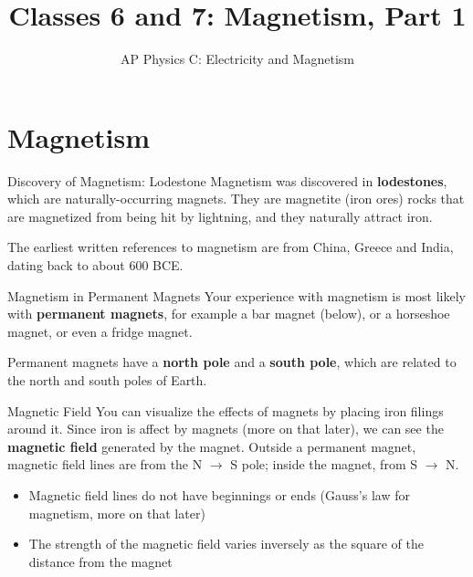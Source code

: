 \documentclass[12pt,aspectratio=169]{beamer}
\title{Classes 6 and 7: Magnetism, Part 1}
\subtitle{AP Physics C: Electricity and Magnetism}
\begin{document}
\begin{frame}
  \maketitle
\end{frame}



\section[Discovery]{Magnetism}

\begin{frame}{Discovery of Magnetism: Lodestone}
  Magnetism was discovered in \textbf{lodestones}, which are naturally-occurring
  magnets. They are magnetite (iron ores) rocks that are magnetized from being
  hit by lightning, and they naturally attract iron.
  \begin{center}
  \end{center}
  The earliest written references to magnetism are from China, Greece and
  India, dating back to about 600 BCE.
\end{frame}



\begin{frame}{Magnetism in Permanent Magnets}
  Your experience with magnetism is most likely with \textbf{permanent
    magnets}, for example a bar magnet (below), or a horseshoe magnet, or even
  a fridge magnet.
  \begin{center}
  \end{center}
  Permanent magnets have a \textbf{north pole} and a \textbf{south pole}, which
  are related to the north and south poles of Earth.
\end{frame}


\begin{frame}{Magnetic Field}
  You can visualize the effects of magnets by placing iron filings around it.
  Since iron is affect by magnets (more on that later), we can see the
  \textbf{magnetic field} generated by the magnet.
  Outside a permanent magnet, magnetic field lines are from the N $\to$ S pole;
  inside the magnet, from S $\to$ N.
  \begin{center}
  \end{center}
  \begin{itemize}
  \item Magnetic field lines do not have beginnings or ends (Gauss's law for
    magnetism, more on that later)
  \item The strength of the magnetic field varies inversely as the square of
    the distance from the magnet
  \end{itemize}
\end{frame}
\end{document}
